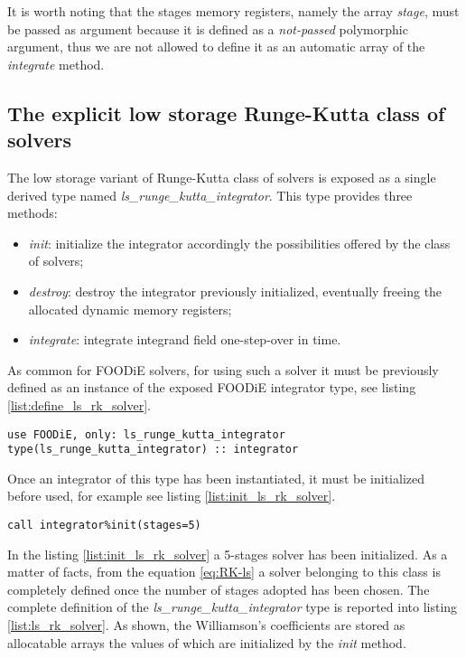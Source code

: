 \documentclass[pdftex,preprint,3p,times,numbers]{elsarticle}
\begin{document}
It is worth noting that the stages memory registers, namely the array \emph{stage}, must be passed as argument because it is defined as a \emph{not-passed} polymorphic argument, thus we are not allowed to define it as an automatic array of the \emph{integrate} method.

\subsection{The explicit low storage Runge-Kutta class of solvers}\label{subsec:solver_ls_rk}

The low storage variant of Runge-Kutta class of solvers is exposed as a single derived type named \emph{ls\_runge\_kutta\_integrator}. This type provides three methods:

\begin{itemize}
  \item \emph{init}: initialize the integrator accordingly the possibilities offered by the class of solvers;
  \item \emph{destroy}: destroy the integrator previously initialized, eventually freeing the allocated dynamic memory registers;
  \item \emph{integrate}: integrate integrand field one-step-over in time.
  \end{itemize}

As common for FOODiE solvers, for using such a solver it must be previously defined as an instance of the exposed FOODiE integrator type, see listing \ref{list:define_ls_rk_solver}.

\begin{lstlisting}[firstnumber=1,style=code,caption={definition of an explicit low storage Runge-Kutta integrator},label={list:define_ls_rk_solver}]
use FOODiE, only: ls_runge_kutta_integrator
type(ls_runge_kutta_integrator) :: integrator
\end{lstlisting}

Once an integrator of this type has been instantiated, it must be initialized before used, for example see listing \ref{list:init_ls_rk_solver}.

\begin{lstlisting}[firstnumber=1,style=code,caption={example of initialization of an explicit low storage Runge-Kutta integrator},label={list:init_ls_rk_solver}]
call integrator%init(stages=5)
\end{lstlisting}

In the listing \ref{list:init_ls_rk_solver} a 5-stages solver has been initialized. As a matter of facts, from the equation \ref{eq:RK-ls} a solver belonging to this class is completely defined once the number of stages adopted has been chosen. The complete definition of the \emph{ls\_runge\_kutta\_integrator} type is reported into listing \ref{list:ls_rk_solver}. As shown, the Williamson's coefficients are stored as allocatable arrays the values of which are initialized by the \emph{init} method.
\end{document}
